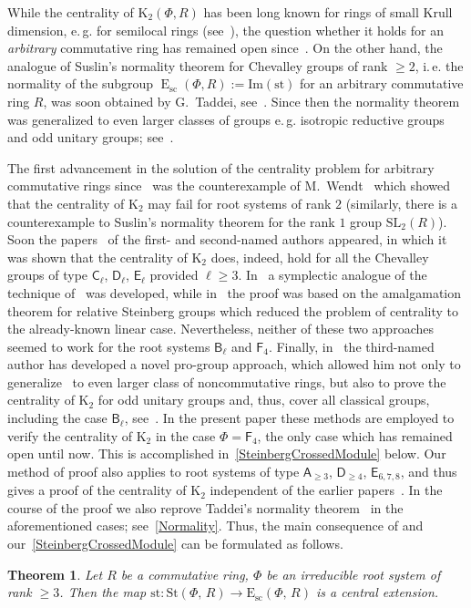 \documentclass[oneside, 11pt]{amsart}
\numberwithin{equation}{section}
\newtheorem*{theorem*}{Theorem}
\theoremstyle{definition}
\theoremstyle{remark}
\DeclareMathOperator\E{E}
\newcommand{\rA}{\mathsf{A}}
\newcommand{\rB}{\mathsf{B}}
\newcommand{\rC}{\mathsf{C}}
\newcommand{\rD}{\mathsf{D}}
\newcommand{\rE}{\mathsf{E}}
\newcommand{\rF}{\mathsf{F}}
\begin{document}
While the centrality of $\mathrm K_2(\Phi, R)$ has been long known for rings of small Krull dimension, e.\,g. for semilocal rings (see~\cite{Ste73}), the question whether it holds for an {\it arbitrary} commutative ring has remained open since~\cite{vdK}.
On the other hand, the analogue of Suslin's normality theorem for Chevalley groups of rank $\geq 2$, i.\,e. the normality of the subgroup $\E_{\mathrm{sc}}(\Phi, R):= \mathrm{Im}(\mathrm{st})$ for an arbitrary commutative ring $R$, was soon obtained by G.~Taddei, see~\cite{Ta86}. Since then the normality theorem was generalized to even larger classes of groups e.\,g. isotropic reductive groups and odd unitary groups; see~\cite{Pe05,PS09,Ste16}.

The first advancement in the solution of the centrality problem for arbitrary commutative rings since~\cite{vdK} was the counterexample of M.~Wendt~\cite{Wendt} which showed that the centrality of $\mathrm K_2$ may fail for root systems of rank $2$ (similarly, there is a counterexample to Suslin's normality theorem for the rank $1$ group $\mathrm{SL}_2(R)$). Soon the papers~\cite{Lav,Sin,LavSin} of the first- and second-named authors appeared, in which it was shown that the centrality of $\mathrm K_2$ does, indeed, hold for all the Chevalley groups of type $\rC_\ell$, $\rD_\ell$, $\rE_\ell$ provided $\ell\geq 3$. In~\cite{Lav} a symplectic analogue of the technique of~\cite{vdK} was developed, while in~\cite{Sin, LavSin} the proof was based on the amalgamation theorem for relative Steinberg groups which reduced the problem of centrality to the already-known linear case. Nevertheless, neither of these two approaches seemed to work for the root systems $\rB_\ell$ and $\rF_4$. Finally, in~\cite{Vor1} the third-named author has developed a novel pro-group approach, which allowed him not only to generalize~\cite{vdK,Tul} to even larger class of noncommutative rings, but also to prove the centrality of $\mathrm K_2$ for odd unitary groups and, thus, cover all classical groups, including the case $\rB_\ell$, see~\cite{Vor2}. In the present paper these methods are employed to verify the centrality of $\mathrm K_2$ in the case $\Phi = \rF_4$, the only case which has remained open until now.
This is accomplished in~\cref{SteinbergCrossedModule} below. Our method of proof also applies to root systems of type $\rA_{\geq 3}$, $\rD_{\geq 4}$, $\rE_{6,7,8}$, and thus gives a proof of the centrality of $\mathrm{K}_2$ independent of the earlier papers~\cite{vdK,Sin,LavSin}. In the course of the proof we also reprove Taddei's normality theorem~\cite{Ta86} in the aforementioned cases; see~\cref{Normality}. Thus, the main consequence of \cite{Vor2} and our~\cref{SteinbergCrossedModule} can be formulated as follows.
\begin{theorem*}
Let $R$ be a commutative ring, $\Phi$ be an irreducible root system of rank $\geq 3$. 
Then the map $\mathrm{st}\colon\mathrm{St}(\Phi,\,R) \to \mathrm{E}_{\mathrm{sc}}(\Phi,\,R)$ is a central extension.
\end{theorem*}
\end{document}
